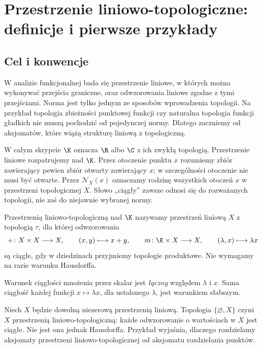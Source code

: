 \section{Przestrzenie liniowo-topologiczne: definicje i pierwsze przykłady}\label{sec:tvs}

\providecommand{\atlasref}[2]{#2}


\subsection{Cel i konwencje}

W analizie funkcjonalnej bada się przestrzenie liniowe, w których można
wykonywać przejścia graniczne, oraz odwzorowania liniowe zgodne z tymi
przejściami. Norma jest tylko jednym ze sposobów wprowadzenia topologii.
Na przykład topologia zbieżności punktowej funkcji czy naturalna topologia
funkcji gładkich nie muszą pochodzić od pojedynczej normy. Dlatego zaczniemy
od aksjomatów, które wiążą strukturę liniową z topologiczną.

W całym skrypcie $\K$ oznacza $\R$ albo $\C$ z ich zwykłą topologią.
Przestrzenie liniowe rozpatrujemy nad $\K$. Przez otoczenie punktu $x$
rozumiemy zbiór zawierający pewien zbiór otwarty zawierający $x$;
w szczególności otoczenie nie musi być otwarte. Przez $\mathcal N_X(x)$
oznaczamy rodzinę wszystkich otoczeń $x$ w przestrzeni topologicznej $X$.
Słowo „ciągły” zawsze odnosi się do rozważanych topologii, nie zaś
do niejawnie wybranej normy.

\begin{definicja}\label{def:tvs}
Przestrzenią liniowo-topologiczną nad $\K$ nazywamy przestrzeń liniową
$X$ z topologią $\tau$, dla której odwzorowania
\[
 +\colon X\times X\longrightarrow X,\qquad (x,y)\longmapsto x+y,
 \qquad
 m\colon\K\times X\longrightarrow X,\qquad (\lambda,x)\longmapsto\lambda x
\]
są ciągłe, gdy w dziedzinach przyjmiemy topologie produktowe.
Nie wymagamy na razie warunku Hausdorffa.
\end{definicja}

Warunek ciągłości mnożenia przez skalar jest \emph{łączny} względem
$\lambda$ i $x$. Sama ciągłość każdej funkcji $x\mapsto\lambda x$,
dla ustalonego $\lambda$, jest warunkiem słabszym.

\begin{przyklad}
Niech $X$ będzie dowolną niezerową przestrzenią liniową.
Topologia $\{\varnothing,X\}$ czyni $X$ przestrzenią
liniowo-topologiczną: każde odwzorowanie o wartościach w $X$ jest
ciągłe. Nie jest ona jednak Hausdorffa. Przykład wyjaśnia,
dlaczego rozdzielamy aksjomaty przestrzeni liniowo-topologicznej
od aksjomatu rozdzielania punktów.
\end{przyklad}

